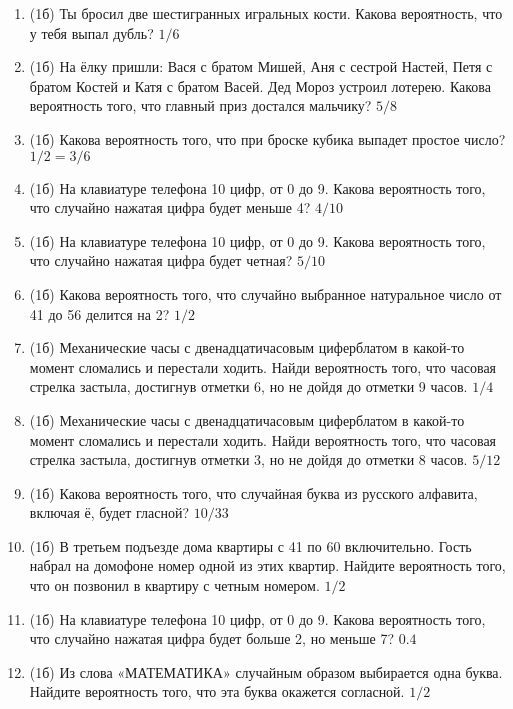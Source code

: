 \documentclass[a4paper, 12pt]{article}
\begin{document}
\begin{enumerate}
\item (1б) Ты бросил две шестигранных игральных кости. Какова вероятность, что у тебя выпал дубль?
$1/6$

\item (1б) На ёлку пришли: Вася с братом Мишей, Аня с сестрой Настей, Петя с братом Костей и Катя с братом Васей. Дед Мороз устроил лотерею. 
Какова вероятность того, что главный приз достался мальчику?
$5/8$

\item (1б) Какова вероятность того, что при броске кубика выпадет простое число?
$1/2=3/6$

\item (1б) На клавиатуре телефона 10 цифр, от 0 до 9. Какова вероятность того, что случайно нажатая цифра будет меньше 4?
$4/10$

\item (1б) На клавиатуре телефона 10 цифр, от 0 до 9. Какова вероятность того, что случайно нажатая цифра будет четная?
$5/10$

\item (1б) Какова вероятность того, что случайно выбранное натуральное число от 41 до 56 делится на 2?
$1/2$

\item (1б) Механические часы с двенадцатичасовым циферблатом в какой-то момент сломались и перестали ходить. Найди вероятность того, 
что часовая стрелка застыла, достигнув отметки 6, но не дойдя до отметки 9 часов.
$1/4$

\item (1б) Механические часы с двенадцатичасовым циферблатом в какой-то момент сломались и перестали ходить. Найди вероятность того, 
что часовая стрелка застыла, достигнув отметки 3, но не дойдя до отметки 8 часов.
$5/12$

\item (1б) Какова вероятность того, что случайная буква из русского алфавита, включая ё, будет гласной?
$10/33$

\item (1б) В третьем подъезде дома квартиры с 41 по 60 включительно. Гость набрал на домофоне номер одной из этих квартир. 
Найдите вероятность того, что он позвонил в квартиру с четным номером. 
$1/2$

\item (1б) На клавиатуре телефона 10 цифр, от 0 до 9. Какова вероятность того, что случайно нажатая цифра будет больше 2, но меньше 7? 
$0.4$

\item (1б) Из слова «МАТЕМАТИКА» случайным образом выбирается одна буква. Найдите вероятность того, что эта буква окажется согласной.
$1/2$


\end{enumerate}
\end{document}
